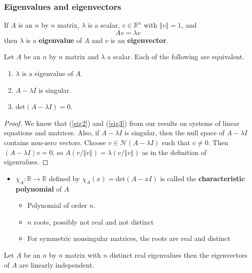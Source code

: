 \documentclass[compress]{beamer}
\def\R{\mathbb{R}}
\newcommand{\norm}[1]{\left\Vert {#1} \right\Vert}
\renewcommand{\det}{\mathrm{det}}
\renewcommand{\to}{{\rightarrow}}
\begin{document}
\begin{frame}\frametitle{Eigenvalues and eigenvectors}
  \begin{definition}
    If $A$ is an $n$ by $n$ matrix, $\lambda$ is a scalar, $v \in \R^n$
    with $\norm{v} = 1$, 
    and 
    \[ Av = \lambda v \]
    then $\lambda$ is a \textbf{eigenvalue} of $A$ and $v$ is an
    \textbf{eigenvector}. 
  \end{definition}
\end{frame}

\begin{frame}
  \begin{lemma}
    Let $A$ be an $n$ by $n$ matrix and $\lambda$ a scalar. Each of the
    following are equivalent.
    \begin{enumerate}
    \item\label{eig1} $\lambda$ is a eigenvalue of $A$.
    \item\label{eig2} $A - \lambda I$ is singular.
    \item\label{eig3} $\det(A - \lambda I ) = 0$.
    \end{enumerate}
  \end{lemma}
  \begin{proof}
    We know that (\ref{eig2}) and (\ref{eig3}) from our results on
    systems of linear equations and matrices. Also, if $A - \lambda I$
    is singular, then the null space of $A - \lambda I$ contains
    non-zero vectors. Choose $v \in \mathcal{N}(A-\lambda I)$ such that
    $v \neq 0$. Then $(A-\lambda I) v = 0$, so $A(v/\norm{v}) =
    \lambda(v/\norm{v})$ as in the definition of eigenvalues. 
  \end{proof}
\end{frame}

\begin{frame}
  \begin{itemize}
  \item $\chi_A:\R\to\R$ defined by $\chi_A(x) = \det(A - x I)$
    is called the \textbf{characteristic polynomial} of $A$
    \begin{itemize} 
    \item Polynomial of order $n$.
    \item $n$ roots, possibly not real and not distinct
    \item For symmetric nonsingular matrices, the roots are real and
      distinct
    \end{itemize}
  \end{itemize}
  \begin{lemma}
    Let $A$ be an $n$ by $n$ matrix with $n$ distinct real eigenvalues
    then the eigenvectors of $A$ are linearly independent.
  \end{lemma}
\end{frame}
\end{document}

